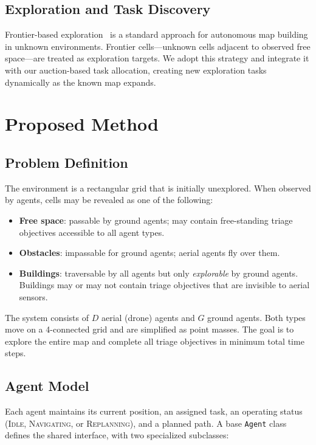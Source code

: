 \documentclass[conference]{IEEEtran}
\begin{document}
\subsection{Exploration and Task Discovery}

Frontier-based exploration~\cite{yamauchi1997frontier} is a standard approach for autonomous map building in unknown environments. Frontier cells---unknown cells adjacent to observed free space---are treated as exploration targets. We adopt this strategy and integrate it with our auction-based task allocation, creating new exploration tasks dynamically as the known map expands.

\section{Proposed Method}

\subsection{Problem Definition}

The environment is a rectangular grid that is initially unexplored. When observed by agents, cells may be revealed as one of the following:
\begin{itemize}
    \item \textbf{Free space}: passable by ground agents; may contain free-standing triage objectives accessible to all agent types.
    \item \textbf{Obstacles}: impassable for ground agents; aerial agents fly over them.
    \item \textbf{Buildings}: traversable by all agents but only \emph{explorable} by ground agents. Buildings may or may not contain triage objectives that are invisible to aerial sensors.
\end{itemize}

The system consists of $D$ aerial (drone) agents and $G$ ground agents. Both types move on a 4-connected grid and are simplified as point masses. The goal is to explore the entire map and complete all triage objectives in minimum total time steps.

\subsection{Agent Model}

Each agent maintains its current position, an assigned task, an operating status (\textsc{Idle}, \textsc{Navigating}, or \textsc{Replanning}), and a planned path. A base \texttt{Agent} class defines the shared interface, with two specialized subclasses:
\end{document}
